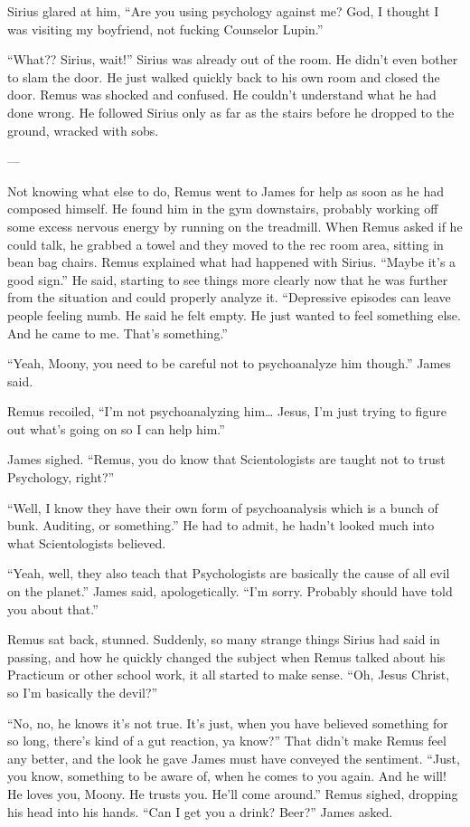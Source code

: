 \documentclass[12pt,twoside,openright]{memoir}
\begin{document}
Sirius glared at him, ``Are you using psychology against me? God, I thought I was visiting my boyfriend, not fucking Counselor Lupin.'' 

``What?? Sirius, wait!'' Sirius was already out of the room. He didn't even bother to slam the door. He just walked quickly back to his own room and closed the door. Remus was shocked and confused. He couldn't understand what he had done wrong. He followed Sirius only as far as the stairs before he dropped to the ground, wracked with sobs. 

---

Not knowing what else to do, Remus went to James for help as soon as he had composed himself. He found him in the gym downstairs, probably working off some excess nervous energy by running on the treadmill. When Remus asked if he could talk, he grabbed a towel and they moved to the rec room area, sitting in bean bag chairs. Remus explained what had happened with Sirius. ``Maybe it's a good sign.'' He said, starting to see things more clearly now that he was further from the situation and could properly analyze it. ``Depressive episodes can leave people feeling numb. He said he felt empty. He just wanted to feel something else. And he came to me. That's something.''

``Yeah, Moony, you need to be careful not to psychoanalyze him though.'' James said.

Remus recoiled, ``I'm not psychoanalyzing him… Jesus, I'm just trying to figure out what's going on so I can help him.''

James sighed. ``Remus, you do know that Scientologists are taught not to trust Psychology, right?''

``Well, I know they have their own form of psychoanalysis which is a bunch of bunk. Auditing, or something.'' He had to admit, he hadn't looked much into what Scientologists believed.

``Yeah, well, they also teach that Psychologists are basically the cause of all evil on the planet.'' James said, apologetically. ``I'm sorry. Probably should have told you about that.''

Remus sat back, stunned. Suddenly, so many strange things Sirius had said in passing, and how he quickly changed the subject when Remus talked about his Practicum or other school work, it all started to make sense. ``Oh, Jesus Christ, so I'm basically the devil?''

``No, no, he knows it's not true. It's just, when you have believed something for so long, there's kind of a gut reaction, ya know?'' That didn't make Remus feel any better, and the look he gave James must have conveyed the sentiment. ``Just, you know, something to be aware of, when he comes to you again. And he will! He loves you, Moony. He trusts you. He'll come around.'' Remus sighed, dropping his head into his hands. ``Can I get you a drink? Beer?'' James asked.
\end{document}
